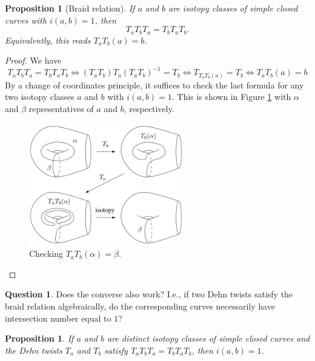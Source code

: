 \documentclass[reqno]{amsart}
\newtheorem{proposition}[theorem]{Proposition}
\theoremstyle{definition}
\newtheorem{question}[theorem]{Question}
\theoremstyle{remark}
\begin{document}
\begin{proposition}[Braid relation]\label{dehn-braid-relation}
    If $a$ and $b$ are isotopy classes of simple closed
    curves with $i(a,b) = 1$, then
    \[
    T_a T_b T_a = T_b T_a T_b.
    \] 
    Equivalently, this reads
    $T_a T_b(a) = b$.
\end{proposition}

\begin{proof}
    We have
    \[
    T_a T_b T_a = T_b T_a T_b \iff
    \left( T_a T_b \right) T_a \left( T_a T_b \right)^{-1}
    = T_b
    \iff
    T_{T_a T_b (a)} = T_b
    \iff
    T_a T_b (a) = b
    \] 
    By a change of coordinates principle, it suffices
    to check the last
    formula for any two isotopy classes
    $a$ and $b$ with $i(a,b) = 1$. This is
    shown in Figure \ref{fig:dehn-twist-braid-relation-png}
    with $\alpha$ and $\beta$ representatives of
    $a$ and $b$, respectively.

    \begin{figure}[H]
        \centering
        \includegraphics[width=0.6\textwidth]{dehn-twist-braid-relation.png}
        \caption{Checking
        $T_a T_b \left( \alpha \right) =
    \beta$.}
        \label{fig:dehn-twist-braid-relation-png}
    \end{figure}
    
\end{proof}

\begin{question}
    Does the converse also work? I.e., if two Dehn twists
    satisfy the braid relation algebraically, do the
    corresponding curves necessarily have intersection
    number equal to $1$?
\end{question}

\begin{proposition}\cite[Proposition 3.13]{Farb-Margalit}
    If $a$ and $b$ are distinct isotopy classes of simple closed
    curves and the Dehn twists $T_a$ and $T_b$ satisfy
    $T_a T_b T_a = T_b T_a T_b$, then
    $i(a,b) = 1$.
\end{proposition}
\end{document}
